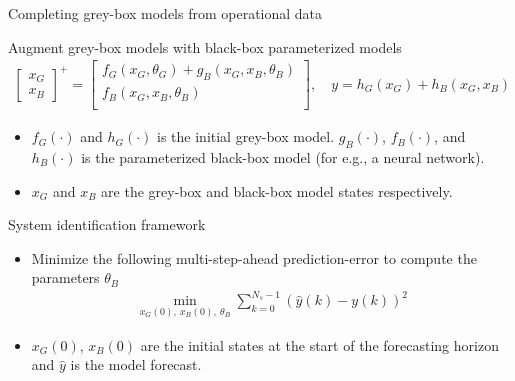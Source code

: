 \documentclass[xcolor=dvipsnames, 8pt]{beamer} %
\begin{document}
\begin{frame}{Completing grey-box models from operational data}
	\begin{block}{Augment grey-box models with 
				  black-box parameterized models}
		\begin{align*}
			\begin{bmatrix}
			  x_G \\
			  x_B
			\end{bmatrix}^+ = \begin{bmatrix}
			  f_G(x_G, \theta_G) + g_B(x_G, x_B, \theta_B)\\
			  f_B(x_G, x_B, \theta_B) \\
			\end{bmatrix}, \quad
			y = h_G(x_G) + h_B(x_G, x_B)
		  \end{align*}
		  \begin{itemize}
			\item $f_G(\cdot)$ and $h_G(\cdot)$ is the initial grey-box model. 
			$g_B(\cdot)$, $f_B(\cdot)$, and $h_B(\cdot)$ is the parameterized black-box model (for e.g., a neural network).
			\item $x_G$ and $x_B$ are the grey-box and black-box model states
			respectively.
		\end{itemize}
	\end{block}
	\begin{block}{System identification framework}
		\begin{itemize}
			\item Minimize the following 
			multi-step-ahead prediction-error to compute the 
			parameters $\theta_B$
			\begin{align*}
		\min_{x_G(0), \ x_B(0), \ \theta_B} \sum_{k=0}^{N_s-1} (\hat{y}(k) - y(k))^2
			\end{align*}
			\item $x_G(0)$, $x_B(0)$ are the initial states at the 
			start of the forecasting horizon and $\hat{y}$ is the model forecast.
		\end{itemize}
	\end{block}
\end{frame}
	
\end{document}
